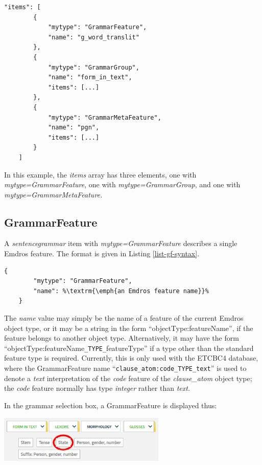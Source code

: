 \documentclass[11pt,oneside,a4paper]{memoir}
\begin{document}
\begin{lstlisting}[caption=A sample items value,label=list-itemssample]
    "items": [
        {
            "mytype": "GrammarFeature",
            "name": "g_word_translit"
        },
        {
            "mytype": "GrammarGroup",
            "name": "form_in_text",
            "items": [...]
        },
        {
            "mytype": "GrammarMetaFeature",
            "name": "pgn",
            "items": [...]
        }
    ]
\end{lstlisting}

In this example, the \emph{items} array has three elements, one with \emph{mytype=GrammarFeature},
one with \emph{mytype=GrammarGroup}, and one with \emph{mytype=GrammarMetaFeature.}

\subsection{GrammarFeature}\label{sec-grammarfeature}

A \emph{sentencegrammar} item with \emph{mytype=GrammarFeature} describes a single Emdros
feature. The format is given in Listing \ref{list-gf-syntax}.

\begin{lstlisting}[caption=GrammarFeature syntax,label=list-gf-syntax]
    {
        "mytype": "GrammarFeature",
        "name": %\textrm{\emph{an Emdros feature name}}%
    }
\end{lstlisting}

The \emph{name} value may simply be the name of a feature of the current Emdros object type, or it
may be a string in the form ``objectType:featureName'', if the feature belongs to another object
type. Alternatively, it may have the form ``objectType:featureName\texttt{\_TYPE\_}featureType'' if
a type other than the standard feature type is required. Currently, this is only used with the
ETCBC4 database, where the GrammarFeature name ``\texttt{clause\_atom:code\_TYPE\_text}'' is used to
denote a \emph{text} interpretation of the \emph{code} feature of the \emph{clause\_atom} object
type; the \emph{code} feature normally has type \emph{integer} rather than \emph{text.}

\Needspace*{5cm}%
In the grammar selection box, a GrammarFeature is displayed thus:

\begin{center}
  \includegraphics[width=0.6\textwidth]{state1.png}
\end{center}
\end{document}
